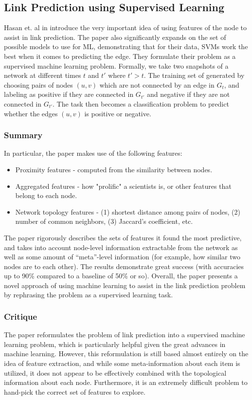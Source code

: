 \documentclass[letterpaper, 11 pt, conference]{ieeeconf}  %
\begin{document}
\subsection{Link Prediction using Supervised Learning}
Hasan et. al in \cite{Hasan06linkprediction} introduce the very important idea of using features of the node to assist in link prediction. The paper also significantly expands on the set of possible models to use for ML, demonstrating that for their data, SVMs work the best when it comes to predicting the edge. They formulate their problem as a supervised machine learning problem. Formally, we take two snapshots of a network at different times $t$ and $t'$ where $t' > t$. The training set of generated by choosing pairs of nodes $(u,v)$ which are not connected by an edge in $G_t$, and labeling as positive if they are connected in $G_{t'}$ and negative if they are not connected in $G_{t'}$. The task then becomes a classification problem to predict whether the edges $(u,v)$ is positive or negative. 

\subsubsection{Summary}
In particular, the paper makes use of the following features:

\begin{itemize}
\item Proximity features - computed from the similarity between nodes.
\item Aggregated features - how "prolific" a scientists is, or other features that belong to each node.
\item Network topology features - (1) shortest distance among pairs of nodes, (2) number of common neighbors, (3) Jaccard's coefficient, etc.
\end{itemize}

The paper rigorously describes the sets of features it found the most predictive, and takes into account node-level information extractable from the network as well as some amount of ``meta''-level information (for example, how similar two nodes are to each other). The results demonstrate great success (with accuracies up to 90\% compared to a baseline of 50\% or so). Overall, the paper presents a novel approach of using machine learning to assist in the link prediction problem by rephrasing the problem as a supervised learning task.

\subsubsection{Critique}
The paper reformulates the problem of link prediction into a supervised machine learning problem, which is particularly helpful given the great advances in machine learning. However, this reformulation is still based almost entirely on the idea of feature extraction, and while some meta-information about each item is utilized, it does not appear to be effectively combined with the topological information about each node. Furthermore, it is an extremely difficult problem to hand-pick the correct set of features to explore.
\end{document}
